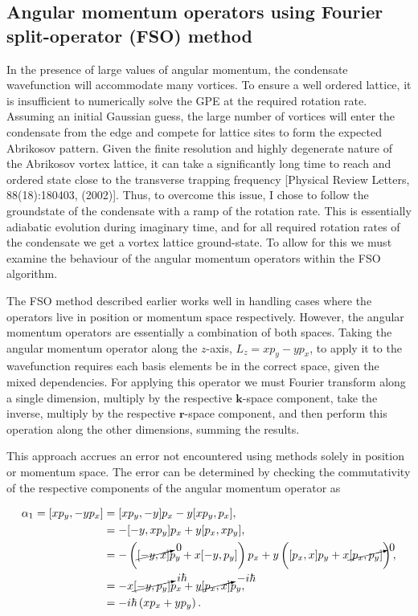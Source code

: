 \subsection{Angular momentum operators using Fourier split-operator (FSO) method}
In the presence of large values of angular momentum, the condensate wavefunction will accommodate many vortices. To ensure a well ordered lattice, it is insufficient to numerically solve the GPE at the required rotation rate. Assuming an initial Gaussian guess, the large number of vortices will enter the condensate from the edge and compete for lattice sites to form the expected Abrikosov pattern. Given the finite resolution and highly degenerate nature of the Abrikosov vortex lattice, it can take a significantly long time to reach and ordered state close to the transverse trapping frequency [Physical
Review Letters, 88(18):180403, (2002)]. Thus, to overcome this issue, I chose to follow the groundstate of the condensate with a ramp of the rotation rate. This is essentially adiabatic evolution during imaginary time, and for all required rotation rates of the condensate we get a vortex lattice ground-state. To allow for this we must examine the behaviour of the angular momentum operators within the FSO algorithm.

The FSO method described earlier works well in handling cases where the operators live in position or momentum space respectively. However, the angular momentum operators are essentially a combination of both spaces. Taking the angular momentum operator along the $z$-axis, $L_z = xp_y - yp_x$, to apply it to the wavefunction requires each basis elements be in the correct space, given the mixed dependencies. For applying this operator we must Fourier transform along a single dimension, multiply by the respective $\mathbf{k}$-space component, take the inverse, multiply by the respective $\mathbf{r}$-space component, and then perform this operation along the other dimensions, summing the results.

This approach accrues an error not encountered using methods solely in position or momentum space. The error can be determined by checking the commutativity of the respective components of the angular momentum operator as

 \begin{subequations}
 \begin{align}
 	\alpha_1 = [x p_y,-y p_x] &= [x p_y,-y] p_x  -  y[x p_y,p_x], \\
 				   &= -[-y,x p_y] p_x + y [p_x, x p_y], \\
 				   &= -\left( {\cancelto{0}{[-y,x]}} p_y + x [-y,p_y] \right) p_x + y \left( [p_x,x] p_y + x {\cancelto{0}{[p_x,p_y]}} \right), \\
 				   &= -x {\cancelto{i\hbar}{[-y, p_y]}} p_x + y {\cancelto{-i\hbar}{[p_x,x]}} p_y, \\
 				   &= -i\hbar \left(x p_x + y p_y \right).
 \end{align}
\end{subequations}

